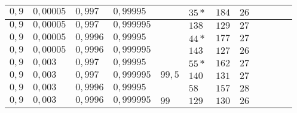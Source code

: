 \begin{table}[h]
\begin{tabular}{|l|l|l|l||l||l|l|l|l|l|l|l|}
$ 0,9  $ & $0,00005$ & $0,997$  & $0,99995$  &&  $35* $ & $184 $   & $26 $  \\ \hline
$ 0,9  $ & $0,00005$ & $0,997$  & $0,999995$ &&  $138   $ & $129 $   & $27 $  \\ \hline
$ 0,9  $ & $0,00005$ & $0,9996$ & $0,99995$  &&  $44* $ & $177 $   & $27 $  \\ \hline
$ 0,9  $ & $0,00005$ & $0,9996$ & $0,999995$ &&  $143   $ & $127 $  & $26 $  \\ \hline
$ 0,9  $ & $0,003 $  & $0,997$  & $0,99995$  &&  $55* $ & $162 $   & $ 27$  \\ \hline
\cellcolor{gray!25}$ 0,9  $ & \cellcolor{gray!25}$0,003 $  & \cellcolor{gray!25}$0,997$  & \cellcolor{gray!25}$0,999995$ &$99,5$&$140  $ & $131   $ & $27 $  \\ \hline
$ 0,9  $ & $0,003 $  & $0,9996$ & $0,99995$  &&  $58   $ & $157 $   & $28 $  \\ \hline
\cellcolor{gray!25}$ 0,9  $ &\cellcolor{gray!25} $0,003 $  & \cellcolor{gray!25}$0,9996$ & \cellcolor{gray!25}$0,999995$ &$99$& $129 $ & $130 $ & $26 $  \\ \hline
\end{tabular}
\end{table}


